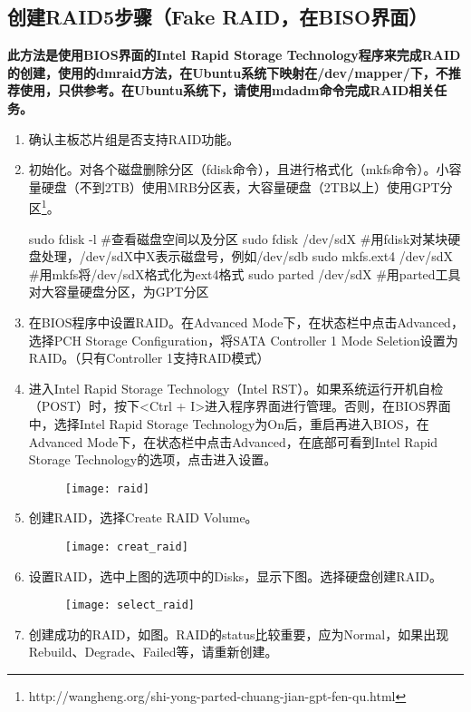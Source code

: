 \subsection{创建RAID5步骤（Fake RAID，在BISO界面）}
\textbf{此方法是使用BIOS界面的Intel Rapid Storage Technology程序来完成RAID的创建，使用的dmraid方法，在Ubuntu系统下映射在/dev/mapper/下，不推荐使用，只供参考。在Ubuntu系统下，请使用mdadm命令完成RAID相关任务。}
\begin{enumerate}
\item 确认主板芯片组是否支持RAID功能。
\item 初始化。对各个磁盘删除分区（fdisk命令），且进行格式化（mkfs命令）。小容量硬盘（不到2TB）使用MRB分区表，大容量硬盘（2TB以上）使用GPT分区\footnote{http://wangheng.org/shi-yong-parted-chuang-jian-gpt-fen-qu.html}。
\begin{bash}
sudo fdisk -l		   #查看磁盘空间以及分区
sudo fdisk /dev/sdX  #用fdisk对某块硬盘处理，/dev/sdX中X表示磁盘号，例如/dev/sdb
sudo mkfs.ext4 /dev/sdX    #用mkfs将/dev/sdX格式化为ext4格式
sudo parted /dev/sdX	#用parted工具对大容量硬盘分区，为GPT分区
\end{bash}
\item 在BIOS程序中设置RAID。在Advanced Mode下，在状态栏中点击Advanced，选择PCH Storage Configuration，将SATA Controller 1 Mode Seletion设置为RAID。（只有Controller 1支持RAID模式）
\item 进入Intel Rapid Storage Technology（Intel RST）。如果系统运行开机自检（POST）时，按下<Ctrl + I>进入程序界面进行管理。否则，在BIOS界面中，选择Intel Rapid Storage Technology为On后，重启再进入BIOS，在Advanced Mode下，在状态栏中点击Advanced，在底部可看到Intel Rapid Storage Technology的选项，点击进入设置。
\begin{figure}[!ht]
\centering
\texttt{[image: raid]}
\end{figure}
\item 创建RAID，选择Create RAID Volume。
\begin{figure}[!ht]
\centering
\texttt{[image: creat\_raid]}
\end{figure}
\item 设置RAID，选中上图的选项中的Disks，显示下图。选择硬盘创建RAID。
\begin{figure}[!ht]
\centering
\texttt{[image: select\_raid]}
\end{figure}
\item 创建成功的RAID，如图。RAID的status比较重要，应为Normal，如果出现Rebuild、Degrade、Failed等，请重新创建。
\begin{figure}[!ht]

\end{figure}
\end{enumerate}
